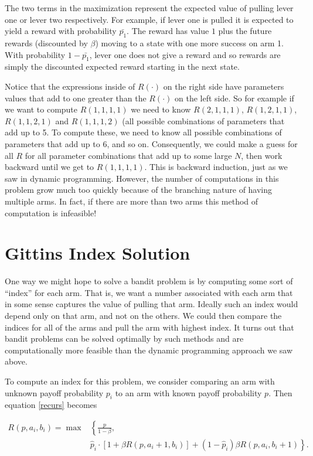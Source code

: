 The two terms in the maximization represent the expected value of pulling lever one or lever two respectively.  For example, if lever one is pulled it is expected to yield a reward with probability $\bar{p_1}$.  The reward has value $1$ plus the future rewards (discounted by $\beta$) moving to a state with one more success on arm 1.  With probability $1-\bar{p_1}$, lever one does not give a reward and so rewards are simply the discounted expected reward starting in the next state.

Notice that the expressions inside of $R(\cdot)$ on the right side have parameters values that add to one greater than the $R(\cdot)$ on the left side.  So for example if we want to compute $R(1,1,1,1)$ we need to know $R(2,1,1,1)$, $R(1,2,1,1)$, $R(1,1,2,1)$ and $R(1,1,1,2)$ (all possible combinations of parameters that add up to 5.  To compute these, we need to know all possible combinations of parameters that add up to 6, and so on.  Consequently, we could make a guess for all $R$ for all parameter combinations that add up to some large $N$, then work backward until we get to $R(1,1,1,1)$.  This is backward induction, just as we saw in dynamic programming.  However, the number of computations in this problem grow much too quickly because of the branching nature of having multiple arms.  In fact, if there are more than two arms this method of computation is infeasible!


\section*{Gittins Index Solution}
One way we might hope to solve a bandit problem is by computing some sort of ``index'' for each arm.  That is, we want a number associated with each arm that in some sense captures the value of pulling that arm.   Ideally such an index would depend only on that arm, and not on the others.  We could then compare the indices for all of the arms and pull the arm with highest index.  It turns out that bandit problems can be solved optimally by such methods and are computationally more feasible than the dynamic programming approach we saw above.

To compute an index for this problem, we consider comparing an arm with unknown payoff probability $p_i$ to an arm with known payoff probability $p$.  Then equation \eqref{recurs} becomes

\begin{equation}\label{index}
\begin{aligned}
R(p,a_i,b_i) = \max&\left\{\frac{p}{1-\beta} \right. ,\\
&  \left.\hat{p}_i\cdot[1 + \beta R(p,a_i+1,b_i)] + (1-\hat{p}_i)\beta R(p, a_i,b_i+1)\right\}.\\
\end{aligned}
\end{equation}


